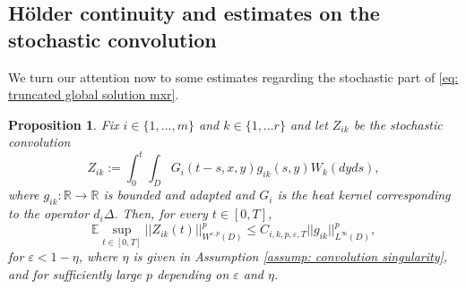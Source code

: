 \documentclass[12pt]{article}
\newtheorem{proposition}{Proposition}[section]
\theoremstyle{definition}
\theoremstyle{remark}
\begin{document}
 \subsection{H\"older continuity and estimates on the stochastic convolution}
We turn our attention now to some estimates regarding the stochastic part of \eqref{eq: truncated global solution mxr}.
\begin{proposition}\label{proposition: Holder regularity of Z_ik}
Fix $i\in \{1,...,m\}$ and $k\in \{1,...r\}$ and let $Z_{ik}$ be the stochastic convolution
\begin{equation}\label{eq: Z_ik}
Z_{ik} := \int_0^t\int_D G_i(t-s,x,y)g_{ik}(s,y)W_k(dyds),
\end{equation}
where $g_{ik}:\mathbb R\rightarrow \mathbb R$ is bounded and adapted and $G_i$ is the heat kernel corresponding to the operator $d_i\Delta$. Then, for every $t\in [0,T]$,
\[
\mathbb E\sup_{t\in [0,T]}||Z_{ik}(t)||^p_{W^{\varepsilon,p}(D)}\leq C_{i,k,p,\varepsilon,T}||g_{ik}||_{L^{\infty}(D)}^p,
\]
for $\varepsilon<1-\eta$, where $\eta$ is given in Assumption \ref{assump: convolution singularity}, and for sufficiently large $p$ depending on $\varepsilon$ and $\eta$.
\end{proposition}
\end{document}
